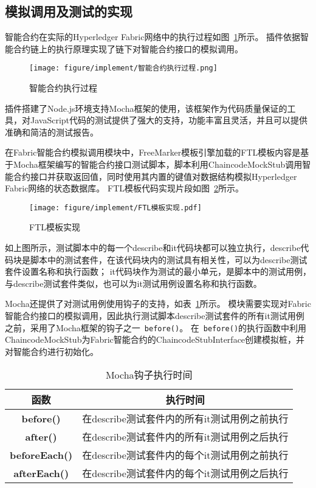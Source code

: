 \subsection{模拟调用及测试的实现}

智能合约在实际的Hyperledger Fabric网络中的执行过程如图~\ref{fig:5.16}所示。
插件依据智能合约链上的执行原理实现了链下对智能合约接口的模拟调用。

\begin{figure}[htb]
  \centering
  \texttt{[image: figure/implement/智能合约执行过程.png]}
  \caption{智能合约执行过程}\label{fig:5.16}
\end{figure}

插件搭建了Node.js环境支持Mocha框架的使用，该框架作为代码质量保证的工具，对JavaScript代码的测试提供了强大的支持，功能丰富且灵活，并且可以提供准确和简洁的测试报告。

在Fabric智能合约模拟调用模块中，FreeMarker模板引擎加载的FTL模板内容是基于Mocha框架编写的智能合约接口测试脚本，脚本利用ChaincodeMockStub调用智能合约接口并获取返回值，同时使用其内置的键值对数据结构模拟Hyperledger Fabric网络的状态数据库。
FTL模板代码实现片段如图~\ref{fig:5.17}所示。

\begin{figure}[htb]
  \centering
  \texttt{[image: figure/implement/FTL模板实现.pdf]}
  \caption{FTL模板实现}\label{fig:5.17}
\end{figure}

如上图所示，测试脚本中的每一个describe和it代码块都可以独立执行，describe代码块是脚本中的测试套件，在该代码块内的测试具有相关性，可以为describe测试套件设置名称和执行函数；
it代码块作为测试的最小单元，是脚本中的测试用例，与describe测试套件类似，也可以为it测试用例设置名称和执行函数。

Mocha还提供了对测试用例使用钩子的支持，如表~\ref{table:mocha}所示。
模块需要实现对Fabric智能合约接口的模拟调用，因此执行测试脚本describe测试套件的所有it测试用例之前，采用了Mocha框架的钩子之一~\texttt{before()}。
在~\texttt{before()}的执行函数中利用ChaincodeMockStub为Fabric智能合约的ChaincodeStubInterface创建模拟桩，并对智能合约进行初始化。

\begin{table}[htb]\scriptsize
\centering
\caption{Mocha钩子执行时间}
\vspace{2mm}
\begin{tabular}{cc}
\toprule
\textbf{函数}&\textbf{执行时间}\\
\midrule
\textbf{before()}&在describe测试套件内的所有it测试用例之前执行\\ \hline
\textbf{after()}&在describe测试套件内的所有it测试用例之后执行\\ \hline
\textbf{beforeEach()}&在describe测试套件内的每个it测试用例之前执行\\ \hline
\textbf{afterEach()}&在describe测试套件内的每个it测试用例之后执行\\
\bottomrule
\end{tabular}
\label{table:mocha}
\end{table}


